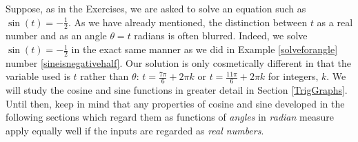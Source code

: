 \smallskip


\smallskip
{}
\label{cosinesineequationsrealnumbers}

Suppose, as in the Exercises, we are asked to solve an equation such as $\sin(t) = -\frac{1}{2}$.  As we have already mentioned, the distinction between $t$ as a real number and as an angle $\theta = t$ radians is often blurred. Indeed, we solve $\sin(t) = -\frac{1}{2}$ in the exact same manner as we did in Example \ref{solveforangle} number \ref{sineisnegativehalf}.  Our solution is only cosmetically different in that the variable used is $t$ rather than $\theta$:  $t = \frac{7\pi}{6} + 2\pi k$ or  $t = \frac{11\pi}{6} + 2\pi k$ for integers, $k$.  We will study the cosine and sine functions in greater detail in Section \ref{TrigGraphs}.  Until then, keep in mind that any properties of cosine and sine developed in the following sections which regard them as functions of \textit{angles} in \textit{radian} measure apply equally well if the inputs are regarded as \textit{real numbers}.


